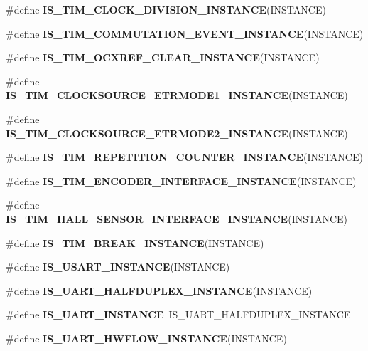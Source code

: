 \begin{DoxyCompactItemize}
\item 
\#define {\bfseries I\+S\+\_\+\+T\+I\+M\+\_\+\+C\+L\+O\+C\+K\+\_\+\+D\+I\+V\+I\+S\+I\+O\+N\+\_\+\+I\+N\+S\+T\+A\+N\+CE}(I\+N\+S\+T\+A\+N\+CE)
\item 
\#define {\bfseries I\+S\+\_\+\+T\+I\+M\+\_\+\+C\+O\+M\+M\+U\+T\+A\+T\+I\+O\+N\+\_\+\+E\+V\+E\+N\+T\+\_\+\+I\+N\+S\+T\+A\+N\+CE}(I\+N\+S\+T\+A\+N\+CE)
\item 
\#define {\bfseries I\+S\+\_\+\+T\+I\+M\+\_\+\+O\+C\+X\+R\+E\+F\+\_\+\+C\+L\+E\+A\+R\+\_\+\+I\+N\+S\+T\+A\+N\+CE}(I\+N\+S\+T\+A\+N\+CE)
\item 
\#define {\bfseries I\+S\+\_\+\+T\+I\+M\+\_\+\+C\+L\+O\+C\+K\+S\+O\+U\+R\+C\+E\+\_\+\+E\+T\+R\+M\+O\+D\+E1\+\_\+\+I\+N\+S\+T\+A\+N\+CE}(I\+N\+S\+T\+A\+N\+CE)
\item 
\#define {\bfseries I\+S\+\_\+\+T\+I\+M\+\_\+\+C\+L\+O\+C\+K\+S\+O\+U\+R\+C\+E\+\_\+\+E\+T\+R\+M\+O\+D\+E2\+\_\+\+I\+N\+S\+T\+A\+N\+CE}(I\+N\+S\+T\+A\+N\+CE)
\item 
\#define {\bfseries I\+S\+\_\+\+T\+I\+M\+\_\+\+R\+E\+P\+E\+T\+I\+T\+I\+O\+N\+\_\+\+C\+O\+U\+N\+T\+E\+R\+\_\+\+I\+N\+S\+T\+A\+N\+CE}(I\+N\+S\+T\+A\+N\+CE)
\item 
\#define {\bfseries I\+S\+\_\+\+T\+I\+M\+\_\+\+E\+N\+C\+O\+D\+E\+R\+\_\+\+I\+N\+T\+E\+R\+F\+A\+C\+E\+\_\+\+I\+N\+S\+T\+A\+N\+CE}(I\+N\+S\+T\+A\+N\+CE)
\item 
\#define {\bfseries I\+S\+\_\+\+T\+I\+M\+\_\+\+H\+A\+L\+L\+\_\+\+S\+E\+N\+S\+O\+R\+\_\+\+I\+N\+T\+E\+R\+F\+A\+C\+E\+\_\+\+I\+N\+S\+T\+A\+N\+CE}(I\+N\+S\+T\+A\+N\+CE)
\item 
\#define {\bfseries I\+S\+\_\+\+T\+I\+M\+\_\+\+B\+R\+E\+A\+K\+\_\+\+I\+N\+S\+T\+A\+N\+CE}(I\+N\+S\+T\+A\+N\+CE)
\item 
\#define {\bfseries I\+S\+\_\+\+U\+S\+A\+R\+T\+\_\+\+I\+N\+S\+T\+A\+N\+CE}(I\+N\+S\+T\+A\+N\+CE)
\item 
\#define {\bfseries I\+S\+\_\+\+U\+A\+R\+T\+\_\+\+H\+A\+L\+F\+D\+U\+P\+L\+E\+X\+\_\+\+I\+N\+S\+T\+A\+N\+CE}(I\+N\+S\+T\+A\+N\+CE)
\item 
\mbox{\label{group___exported__macros_ga14e4b19f7c750110f6c27cf26347ba45}} 
\#define {\bfseries I\+S\+\_\+\+U\+A\+R\+T\+\_\+\+I\+N\+S\+T\+A\+N\+CE}~I\+S\+\_\+\+U\+A\+R\+T\+\_\+\+H\+A\+L\+F\+D\+U\+P\+L\+E\+X\+\_\+\+I\+N\+S\+T\+A\+N\+CE
\item 
\#define {\bfseries I\+S\+\_\+\+U\+A\+R\+T\+\_\+\+H\+W\+F\+L\+O\+W\+\_\+\+I\+N\+S\+T\+A\+N\+CE}(I\+N\+S\+T\+A\+N\+CE)
\item 

\end{DoxyCompactItemize}
